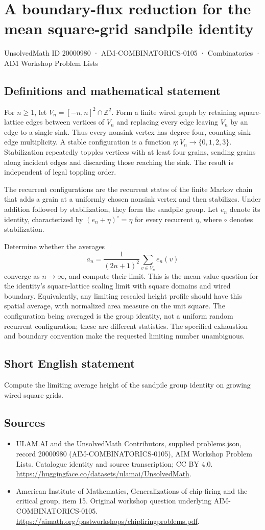 \documentclass[11pt,a4paper]{article}
\begin{document}
\section*{A boundary-flux reduction for the mean square-grid sandpile identity}\label{20000980}
{\small UnsolvedMath ID 20000980 · AIM-COMBINATORICS-0105 · Combinatorics · AIM Workshop Problem Lists}
\subsection{Definitions and mathematical statement}
For $n\geq1$, let $V_n=[-n,n]^2\cap\mathbb Z^2$.
Form a finite wired graph by retaining square-lattice edges between vertices of $V_n$ and replacing every edge leaving $V_n$ by an edge to a single sink.
Thus every nonsink vertex has degree four, counting sink-edge multiplicity.
A stable configuration is a function $\eta:V_n\to\{0,1,2,3\}$.
Stabilization repeatedly topples vertices with at least four grains, sending grains along incident edges and discarding those reaching the sink.
The result is independent of legal toppling order.

The recurrent configurations are the recurrent states of the finite Markov chain that adds a grain at a uniformly chosen nonsink vertex and then stabilizes.
Under addition followed by stabilization, they form the sandpile group.
Let $e_n$ denote its identity, characterized by
$(e_n+\eta)^\circ=\eta$ for every recurrent $\eta$, where $\circ$ denotes stabilization.

Determine whether the averages
\[
 a_n=\frac{1}{(2n+1)^2}\sum_{v\in V_n}e_n(v)
\]
converge as $n\to\infty$, and compute their limit.
This is the mean-value question for the identity's square-lattice scaling limit with square domains and wired boundary.
Equivalently, any limiting rescaled height profile should have this spatial average, with normalized area measure on the unit square.
The configuration being averaged is the group identity, not a uniform random recurrent configuration; these are different statistics.
The specified exhaustion and boundary convention make the requested limiting number unambiguous.
\subsection{Short English statement}
Compute the limiting average height of the sandpile group identity on growing wired square grids.
\subsection{Sources}
\begin{itemize}
\item[S1] ULAM.AI and the UnsolvedMath Contributors, supplied problems.json, record 20000980 (AIM-COMBINATORICS-0105), AIM Workshop Problem Lists. Catalogue identity and source transcription; CC BY 4.0.
\url{https://huggingface.co/datasets/ulamai/UnsolvedMath}.
\item[S2] American Institute of Mathematics, Generalizations of chip-firing and the critical group, item 15. Original workshop question underlying AIM-COMBINATORICS-0105.
\url{https://aimath.org/pastworkshops/chipfiringproblems.pdf}.
\end{itemize}
\end{document}
